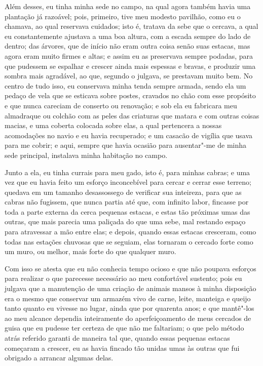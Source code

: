 Além desses, eu tinha minha sede no campo, na qual agora também havia
uma plantação já razoável; pois, primeiro, tive meu modesto pavilhão,
como eu o chamava, ao qual reservava cuidados; isto é, tratava da sebe
que o cercava, a qual eu constantemente ajustava a uma boa altura, com a
escada sempre do lado de dentro; das árvores, que de início não eram
outra coisa senão suas estacas, mas agora eram muito firmes e altas; e
assim eu as preservava sempre podadas, para que pudessem se espalhar e
crescer ainda mais espessas e bravas, e produzir uma sombra mais
agradável, ao que, segundo o julgava, se prestavam muito bem. No centro
de tudo isso, eu conservava minha tenda sempre armada, sendo ela um
pedaço de vela que se esticava sobre postes, cravados no chão com esse
propósito e que nunca careciam de conserto ou renovação; e sob ela eu
fabricara meu almadraque ou colchão com as peles das criaturas que
matara e com outras coisas macias, e uma coberta colocada sobre elas, a
qual pertencera a nossas acomodações no navio e eu havia recuperado; e
um casacão de vigília que usava para me cobrir; e aqui, sempre que havia
ocasião para ausentar"-me de minha sede principal, instalava minha
habitação no campo.

Junto a ela, eu tinha currais para meu gado, isto é, para minhas cabras;
e uma vez que eu havia feito um esforço inconcebível para cercar e
cerrar esse terreno; quedava em um tamanho desassossego de verificar sua
inteireza, para que as cabras não fugissem, que nunca partia até que,
com infinito labor, fincasse por toda a parte externa da cerca pequenas
estacas, e estas tão próximas umas das outras, que mais parecia uma
paliçada do que uma sebe, mal restando espaço para atravessar a mão
entre elas; e depois, quando essas estacas cresceram, como todas nas
estações chuvosas que se seguiam, elas tornaram o cercado forte como um
muro, ou melhor, mais forte do que qualquer muro.

Com isso se atesta que eu não conhecia tempo ocioso e que não poupava
esforços para realizar o que parecesse necessário ao meu confortável
sustento; pois eu julgava que a manutenção de uma criação de animais
mansos à minha disposição era o mesmo que conservar um armazém vivo de
carne, leite, manteiga e queijo tanto quanto eu vivesse no lugar, ainda
que por quarenta anos; e que mantê"-los ao meu alcance dependia
inteiramente do aperfeiçoamento de meus cercados de guisa que eu pudesse
ter certeza de que não me faltariam; o que pelo método atrás referido
garanti de maneira tal que, quando essas pequenas estacas começaram a
crescer, eu as havia fincado tão unidas umas às outras que fui obrigado
a arrancar algumas delas.

